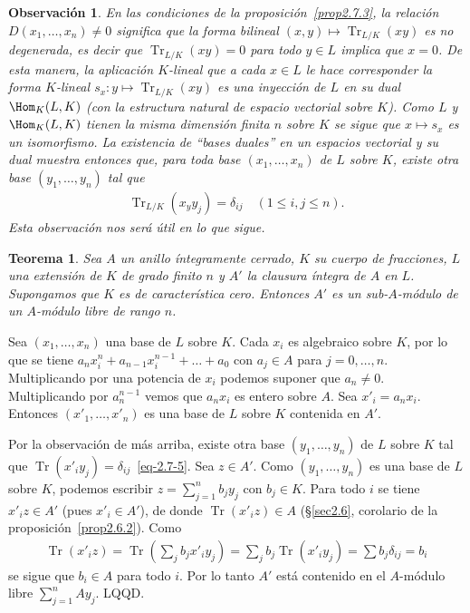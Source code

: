 \documentclass[bibtotoc,leqno,spanish]{amsbook}
\newcommand{\QED}{LQQD.}
\DeclareMathOperator{\Tr}{Tr}
\numberwithin{equation}{section}
\theoremstyle{note}
\theoremstyle{note}
\newtheorem{theorem}{Teorema}
\theoremstyle{rem}
\newtheorem*{remark*}{Observaci\'on}
\numberwithin{theorem}{section}
\numberwithin{proposition}{section}
\numberwithin{definition}{section}
\numberwithin{lemma}{section}
\numberwithin{corollary}{section}
\numberwithin{example}{section}
\numberwithin{footnote}{section}%
\begin{document}
\begin{remark*}
En las condiciones de la proposici\'on~\ref{prop2.7.3}, la relaci\'on $D(x_{1},\dots,x_{n})\neq 0$ significa que
la forma bilineal $(x,y)\mapsto\Tr_{L/K}(xy)$ es {\em no degenerada,} es decir que $\Tr_{L/K}(xy) = 0$
para todo $y\in L$ implica que $x = 0$. De esta manera, la aplicaci\'on $K$-lineal que a cada $x\in L$
le hace corresponder la forma $K$-lineal $s_{x}:y\mapsto\Tr_{L/K}(xy)$ es una inyecci\'on de $L$ en su
dual $\Hom_{K}(L,K)$ (con la estructura natural de espacio vectorial sobre $K$). Como $L$ y $\Hom_{K}(L,K)$
tienen la misma dimensi\'on finita $n$ sobre $K$ se sigue que $x\mapsto s_{x}$ es un isomorfismo. La
existencia de {\em ``bases duales''} en un espacios vectorial y su dual muestra entonces que, para toda
base $(x_{1},\dots,x_{n})$ de $L$ sobre $K$, existe otra base $(y_{1},\dots,y_{n})$ tal que
\begin{gather}\label{eq-2.7-5}
\Tr_{L/K}(x_{y}y_{j}) = \delta_{ij}\quad(1\leq i, j\leq n).
\end{gather}
Esta observaci\'on nos ser\'a \'util en lo que sigue.
\end{remark*}

\begin{theorem}\label{teo2.7.1}
Sea $A$ un anillo \'integramente cerrado, $K$ su cuerpo de fracciones, $L$ una extensi\'on de $K$ de grado
finito $n$ y $A'$ la clausura \'integra de $A$ en $L$. Supongamos que $K$ es de caracter\'istica cero.
Entonces $A'$ es un sub-$A$-m\'odulo  de un $A$-m\'odulo libre de rango $n$.
\end{theorem}

Sea $(x_{1},\dots,x_{n})$ una base de $L$ sobre $K$. Cada $x_{i}$ es algebraico sobre $K$, por lo que se tiene
$a_{n}x_{i}^{n}+a_{n-1}x_{i}^{n-1}+\dots+a_{0}$ con $a_{j}\in A$ para $j=0,\dots,n$. Multiplicando por
una potencia de $x_{i}$ podemos suponer que $a_{n}\neq 0$. Multiplicando por $a_{n}^{n-1}$ vemos que $a_{n}x_{i}$
es entero sobre $A$. Sea $x'_{i} = a_{n}x_{i}$. Entonces $(x'_{1},\dots,x'_{n})$ es una base de $L$ sobre $K$
contenida en $A'$.

Por la observaci\'on de m\'as arriba, existe otra base $(y_{1},\dots,y_{n})$ de $L$ sobre $K$ tal que
$\Tr(x'_{i}y_{j}) = \delta_{ij}$~\eqref{eq-2.7-5}. Sea $z\in A'$. Como $(y_{1},\dots,y_{n})$ es una base de $L$
sobre $K$, podemos escribir $z = \sum_{j=1}^{n}b_{j}y_{j}$ con $b_{j}\in K$. Para todo $i$ se tiene
$x'_{i}z\in A'$ (pues $x'_{i}\in A'$), de donde $\Tr(x'_{i}z)\in A$ (\S\ref{sec2.6}, corolario de la
proposici\'on~\ref{prop2.6.2}). Como
\begin{gather*}
\Tr(x'_{i}z) = \Tr\left(\sum_{j}b_{j}x'_{i}y_{j}\right) = \sum_{j}b_{j}\Tr(x'_{i}y_{j}) = \sum b_{j}\delta_{ij} = b_{i}
\end{gather*}
se sigue que $b_{i}\in A$ para todo $i$. Por lo tanto $A'$ est\'a contenido en el $A$-m\'odulo libre
$\sum_{j=1}^{n}Ay_{j}$. \QED
\end{document}
